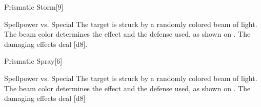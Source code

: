 \begin{spellsection}{Prismatic Storm}[9]
    \begin{spellheader}
    \end{spellheader}
    \begin{spellcontent}
        \begin{spelltargetinginfo}
        \end{spelltargetinginfo}
        \begin{spelleffects}
            \begin{spellattack}{Spellpower vs. Special}
                \spellspecial The target is struck by a randomly colored beam of light. The beam color determines the effect and the defense used, as shown on . The damaging effects deal \spelldamage{}[d8].
            \end{spellattack}
        \end{spelleffects}
    \end{spellcontent}
    \begin{spellfooter}
        \miscastyou
    \end{spellfooter}
\end{spellsection}

\begin{spellsection}{Prismatic Spray}[6]
    \begin{spellheader}
    \end{spellheader}
    \begin{spellcontent}
        \begin{spelltargetinginfo}
        \end{spelltargetinginfo}
        \begin{spelleffects}
            \begin{spellattack}{Spellpower vs. Special}
                \spellspecial The target is struck by a randomly colored beam of light. The beam color determines the effect and the defense used, as shown on . The damaging effects deal \spelldamage{}[d8]
            \end{spellattack}
        \end{spelleffects}
    \end{spellcontent}
    \begin{spellfooter}
        \miscastexplode
    \end{spellfooter}
\end{spellsection}


